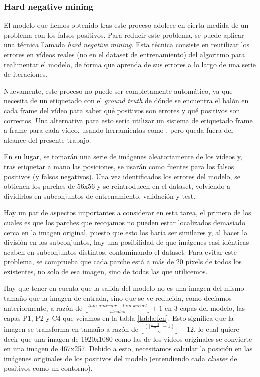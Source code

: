 \subsubsection*{Hard negative mining}

El modelo que hemos obtenido tras este proceso adolece en cierta medida de un problema con los falsos positivos. Para reducir este problema, se puede aplicar una técnica llamada \textit{hard negative mining}. Esta técnica consiste en reutilizar los errores en vídeos reales (no en el dataset de entrenamiento) del algoritmo para realimentar el modelo, de forma que aprenda de sus errores a lo largo de una serie de iteraciones.

Nuevamente, este proceso no puede ser completamente automático, ya que necesita de un etiquetado con el \textit{ground truth} de dónde se encuentra el balón en cada frame del vídeo para saber qué positivos son errores y qué positivos son correctos. Una alternativa para esto sería utilizar un sistema de etiquetado frame a frame para cada vídeo, usando herramientas como \cite{dutta2016via}, pero queda fuera del alcance del presente trabajo.

En su lugar, se tomarán una serie de imágenes aleatoriamente de los vídeos y, tras etiquetar a mano las posiciones, se usarán como fuentes para los falsos positivos (y falsos negativos). Una vez identificados los errores del modelo, se obtienen los parches de 56x56 y se reintroducen en el dataset, volviendo a dividirlos en subconjuntos de entrenamiento, validación y test.

Hay un par de aspectos importantes a considerar en esta tarea, el primero de los cuales es que los parches que recojamos no pueden estar localizados demasiado cerca en la imagen original, puesto que esto los haría ser similares y, al hacer la división en los subconjuntos, hay una posibilidad de que imágenes casi idénticas acaben en subconjuntos distintos, contaminando el dataset. Para evitar este problema, se comprueba que cada parche está a más de 20 píxels de todos los existentes, no solo de esa imagen, sino de todas las que utilicemos.

Hay que tener en cuenta que la salida del modelo no es una imagen del mismo tamaño que la imagen de entrada, sino que se ve reducida, como decíamos anteriormente, a razón de $\lfloor\frac{tam\_anterior - tam\_kernel}{strides}\rfloor+1$ en 3 capas del modelo, las capas P1, P2 y C4 que veíamos en la tabla \ref{tabla:fcn}. Esto significa que la imagen se transforma en tamaño a razón de $\lfloor\frac{(\lfloor\frac{x-3}{2}\rfloor + 1)}{2}\rfloor-12$, lo cual quiere decir que una imagen de 1920x1080 como las de los vídeos originales se convierte en una imagen de 467x257. Debido a esto, necesitamos calcular la posición en las imágenes originales de los positivos del modelo (entendiendo cada \textit{cluster} de positivos como un contorno).


